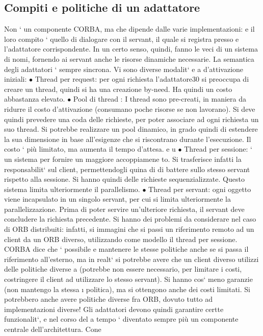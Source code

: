\documentclass[a4paper,12pt]{article}
\begin{document}
\subsection{Compiti e politiche di un adattatore}
Non ` un componente CORBA, ma che dipende dalle varie implementazioni:
e
il loro compito ` quello di dialogare con il servant, il quale si registra presso
e
l'adattatore corrispondente. In un certo senso, quindi, fanno le veci di un sistema
di nomi, fornendo ai servant anche le risorse dinamiche necessarie.
La semantica degli adattatori ` sempre sincrona. Vi sono diverse modalit`
e
a
d'attivazione iniziali:
$\bullet$ Thread per request: per ogni richiesta l'adattatore30 si preoccupa di creare
un thread, quindi si ha una creazione by-need. Ha quindi un costo abbastanza elevato.
$\bullet$ Pool di thread : I thread sono pre-creati, in maniera da ridurre il costo
d'attivazione (consumano poche risorse se non lavorano). Si deve quindi
prevedere una coda delle richieste, per poter associare ad ogni richiesta un
suo thread.
Si potrebbe realizzare un pool dinamico, in grado quindi di estendere la
sua dimensione in base all'esigenze che si riscontrano durante l'esecuzione.
Il costo ` più limitato, ma aumenta il tempo d'attesa.
e u
$\bullet$ Thread per sessione: ` un sistema per fornire un maggiore accoppiamene
to. Si trasferisce infatti la responsabilit` sul client, permettendogli quina
di di battere sullo stesso servant rispetto alla sessione. Si hanno quindi delle richieste sequenzializzate. Questo
sistema limita ulteriormente il
parallelismo.
$\bullet$ Thread per servant: ogni oggetto viene incapsulato in un singolo servant,
per cui si limita ulteriormente la parallelizzazione. Prima di poter servire
un'ulteriore richiesta, il servant deve concludere la richiesta precedente.
Si hanno dei problemi da considerare nel caso di ORB distribuiti: infatti, si
immagini che si passi un riferimento remoto ad un client da un ORB diverso,
utilizzando come modello il thread per sessione. CORBA dice che ` possibile
e
mantenere le stesse politiche anche se si passa il riferimento all'esterno, ma
in realt` si potrebbe avere che un client diverso utilizzi delle politiche diverse
a
(potrebbe non essere necessario, per limitare i costi, costringere il client ad utilizzare lo stesso servant). Si hanno
cos` meno garanzie (non mantengo la stessa
\i{}
politica), ma si ottengono anche dei costi limitati. Si potrebbero anche avere
politiche diverse fra ORB, dovuto tutto ad implementazioni diverse!
Gli adattatori devono quindi garantire certte funzionalit`, e nel corso del
a
tempo ` diventato sempre più un componente centrale dell'architettura. Cone
\end{document}
